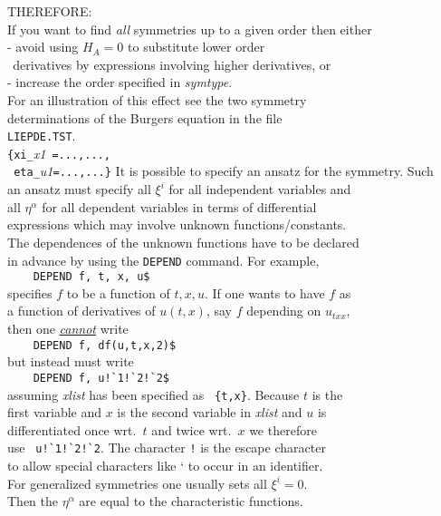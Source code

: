 \documentclass[12pt]{article}
\begin{document}
\begin{tabbing}
\> THEREFORE: \\
\> If you want to find {\it all} symmetries up to a given order then either \\
\> - avoid using $H_A=0$ to substitute lower order \\
\> $\;\,$derivatives by expressions involving higher derivatives, or \\
\> - increase the order specified in {\it symtype}. \\
\> For an illustration of this effect see the two symmetry \\
\> determinations of the Burgers equation in the file \\
\> {\tt LIEPDE.TST}. \\
\verb+{xi_+{\it x1}\verb+ =...,..., +  \>  \\ 
\verb+ eta_+{\it u1}\verb+=...,...}+  \> It is possible to specify an
ansatz for the symmetry. Such \\
\> an ansatz must specify all $\xi^i$ for all independent variables and \\
\> all $\eta^{\alpha}$ for all dependent variables in terms of differential \\
\> expressions which may involve unknown functions/constants. \\
\> The dependences of the unknown functions have to be declared \\
\> in advance by using the {\tt DEPEND} command. For example, \\
\> \verb+    DEPEND f, t, x, u$  + \\
\> specifies $f$ to be a function of $t,x,u$. If one wants to have $f$ as \\
\> a function of derivatives of $u(t,x)$, say $f$ depending on $u_{txx}$, \\
\> then one \underline{{\it cannot}} write \\
\> \verb+    DEPEND f, df(u,t,x,2)$ + \\ 
\> but instead must write \\
\> \verb+    DEPEND f, u!`1!`2!`2$ + \\
\> assuming {\it xlist} has been specified as \verb+ {t,x}+. 
   Because $t$ is the \\
\> first variable and $x$ is the second variable in {\it xlist} and $u$ is \\
\> differentiated once wrt.\ $t$ and twice wrt.\ $x$ we therefore \\
\> use \verb+ u!`1!`2!`2+. The character {\tt !} is the escape character \\
\> to allow special characters like ` to occur in an identifier. \\
\> \hspace{4mm} For generalized symmetries one usually sets all $\xi^i=0$.\\
\> Then the $\eta^{\alpha}$ are equal to the characteristic functions.
\end{tabbing}
\end{document}

